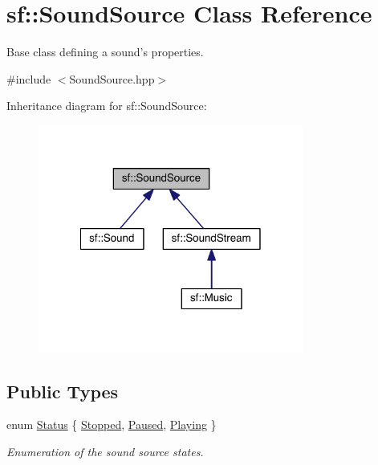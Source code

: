 \hypertarget{classsf_1_1_sound_source}{\section{sf\-:\-:Sound\-Source Class Reference}
\label{classsf_1_1_sound_source}
}


Base class defining a sound's properties.  




{\ttfamily \#include $<$Sound\-Source.\-hpp$>$}



Inheritance diagram for sf\-:\-:Sound\-Source\-:
\nopagebreak
\begin{figure}[H]
\begin{center}
\leavevmode
\includegraphics[width=247pt]{classsf_1_1_sound_source__inherit__graph}
\end{center}
\end{figure}
\subsection*{Public Types}
\begin{DoxyCompactItemize}
\item 
enum \hyperlink{classsf_1_1_sound_source_ac43af72c98c077500b239bc75b812f03}{Status} \{ \hyperlink{classsf_1_1_sound_source_ac43af72c98c077500b239bc75b812f03adabb01e8aa85b2f54b344890addf764a}{Stopped}, 
\hyperlink{classsf_1_1_sound_source_ac43af72c98c077500b239bc75b812f03ac3ca1fcc0394267c9bdbe3dc0a8a7e41}{Paused}, 
\hyperlink{classsf_1_1_sound_source_ac43af72c98c077500b239bc75b812f03af07bdea9f70ef7606dfc9f955beeee18}{Playing}
 \}
\begin{DoxyCompactList}\small\item\em Enumeration of the sound source states. \end{DoxyCompactList}\end{DoxyCompactItemize}
